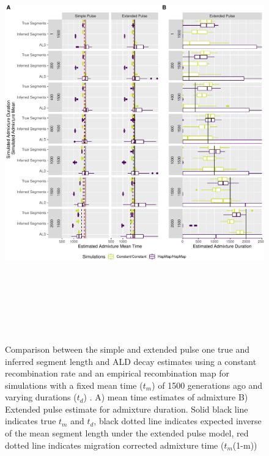 \documentclass[11pt]{article}
\begin{document}
\begin{figure}
\centering
\includegraphics[width=16cm,height=18cm,keepaspectratio]{ATE_Revisions_files/figure-latex/figResult2_1-1.pdf}
\caption{\label{fig:fig3_1} Comparison between the simple and extended pulse one true and inferred segment length and ALD decay estimates using a constant recombination rate and an empirical recombination map for simulations with a fixed mean time ($t_m$) of 1500 generations ago and varying durations ($t_d$) . A) mean time estimates of admixture B) Extended pulse estimate for admixture duration. Solid black line indicates true $t_m$ and $t_d$, black dotted line indicates expected inverse of the mean segment length under the extended pulse model, red dotted line indicates migration corrected admixture time ($t_m$(1-m)) }
\end{figure}
\end{document}
